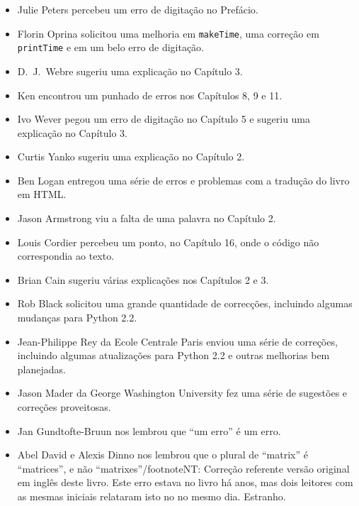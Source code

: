 \documentclass[10pt]{book}
\begin{document}
\begin {itemize}
\item Julie Peters percebeu um erro de digitação no Prefácio.

\item Florin Oprina solicitou uma melhoria em {\tt makeTime},
uma correção em {\tt printTime} e em um belo erro de digitação.

\item D.~J.~Webre sugeriu uma explicação no Capítulo 3.

\item Ken encontrou um punhado de erros nos Capítulos 8, 9 e 11.

\item Ivo Wever pegou um erro de digitação no Capítulo 5 e sugeriu uma explicação
no Capítulo 3.

\item Curtis Yanko sugeriu uma explicação no Capítulo 2.

\item Ben Logan entregou uma série de erros e problemas com a tradução
do livro em HTML.

\item Jason Armstrong viu a falta de uma palavra no Capítulo 2.

\item Louis Cordier percebeu um ponto, no Capítulo 16, onde o código
não correspondia ao texto.

\item Brian Cain sugeriu várias explicações nos Capítulos 2 e 3.

\item Rob Black solicitou uma grande quantidade de correcções, incluindo algumas
mudanças para Python 2.2.

\item Jean-Philippe Rey da Ecole Centrale
Paris enviou uma série de correções, incluindo algumas atualizações para Python 2.2
e outras melhorias bem planejadas.

\item Jason Mader da George Washington University fez uma série
de sugestões e correções proveitosas.

\item Jan Gundtofte-Bruun nos lembrou que ``um erro'' é um erro.

\item Abel David e Alexis Dinno nos lembrou que o plural de
``matrix'' é ``matrices'', e não ``matrixes''/footnote{NT: Correção referente versão original em inglês deste livro}. Este erro estava no
livro há anos, mas dois leitores com as mesmas iniciais relataram isto no
no mesmo dia. Estranho.


\end{itemize}
\end{document}
